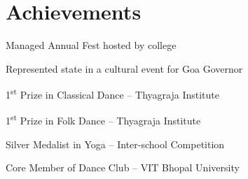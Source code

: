 \documentclass[a4paper,10pt]{article}
\newcommand{\resumeItem}[1]{\item\small{#1}}
\begin{document}
\section*{Achievements}
\resumeItem{Managed Annual Fest hosted by college}
\resumeItem{Represented state in a cultural event for Goa Governor}
\resumeItem{1\textsuperscript{st} Prize in Classical Dance – Thyagraja Institute}
\resumeItem{1\textsuperscript{st} Prize in Folk Dance – Thyagraja Institute}
\resumeItem{Silver Medalist in Yoga – Inter-school Competition}
\resumeItem{Core Member of Dance Club – VIT Bhopal University}
\end{document}
